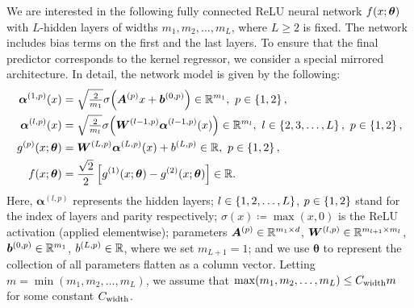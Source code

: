 We are interested in the following fully connected ReLU neural network $f(x;\bm{\theta})$ with $L$-hidden layers
of widths $m_1,m_2,\dots, m_L$, where $L \geq 2$ is fixed.
The network includes bias terms on the first and the last layers.
To ensure that the final predictor corresponds to the kernel regressor, we consider a special mirrored architecture.
In detail, the network model is given by the following:
\begin{align*}
  \begin{split}
    \bm{\alpha}^{(1,p)}(\x) & = \sqrt{\tfrac{2}{m_{1}}} \sigma\xkm{\bm{A}^{(p)}\x+\bm{b}^{(0,p)}}\in\mb{R}^{m_1},~ p\in\dk{1,2},\\
    \bm{\alpha}^{(l,p)}(\x) & = \sqrt{\tfrac{2}{m_{l}}}\sigma\xkm{\bm{W}^{(l-1,p)}\bm{\alpha}^{(l-1,p)}(\x)}\in\mb{R}^{m_{l}},~
    l \in \dk{2,3,\dots,L},~p\in\dk{1,2},\\
    g^{(p)}(\x;\bm{\theta}) & = \bm{W}^{(L,p)}\bm{\alpha}^{(L,p)}(\x)+b^{(L,p)}\in\mb{R},~p\in\dk{1,2},\\
    f(\x;\bm{\theta}) &= \frac{\sqrt{2}}{2}\zk{ g^{(1)}(\x;\bm{\theta}) - g^{(2)}(\x;\bm{\theta}) }\in\mb{R}.
  \end{split}
\end{align*}
Here, $\bm{\alpha}^{(l,p)}$ represents the hidden layers; $l\in\left\{1,2,\dots,L\right\}$, $p\in\left\{1,2\right\}$ stand for the index of layers and parity respectively;
$\sigma(x) \coloneqq \max(x,0)$ is the ReLU activation (applied elementwise);
parameters $\bm{A}^{(p)}\in\mathbb{R}^{m_1\times d}$, $\bm{W}^{(l,p)} \in \mathbb{R}^{m_{l+1} \times m_l}$, $\bm{b}^{(0,p)} \in \mathbb{R}^{m_{1}}$, $b^{(L,p)} \in \mathbb{R}$,
where we set $m_{L+1}=1$;
and we use $\bm{\theta}$ to represent the collection of all parameters flatten as a column vector.
Letting $m = \min(m_1,m_2,\dots,m_{L})$, we assume that $\max(m_1,m_2,\dots,m_{L}) \leq C_{\mathrm{width}} m$ for some constant $C_{\mathrm{width}}$.

